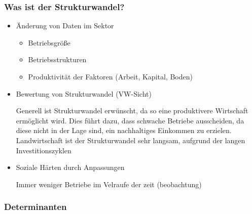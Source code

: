 \documentclass[11pt]{scrartcl}
\begin{document}
\subsubsection{Was ist der Strukturwandel?}
\begin{itemize}
	\item{Änderung von Daten im Sektor}
	\begin{itemize}
		\item Betriebsgröße
		
		\item Betriebsstrukturen

		\item Produktivität der Faktoren (Arbeit, Kapital, Boden)
	\end{itemize}
	\item{Bewertung von Strukturwandel (\ac{VW}-Sicht)}

		Generell ist Strukturwandel erwünscht, da so eine produktivere Wirtschaft ermöglicht wird. Dies führt dazu, dass \glqq schwache\grqq{}  Betriebe ausscheiden, da diese nicht in der Lage sind, ein nachhaltiges Einkommen zu erzielen.
Landwirtschaft ist der Strukturwandel sehr langsam, aufgrund der langen Investitionszyklen
	\item{Soziale Härten durch Anpassungen}

Immer weniger Betriebe im Velraufe der zeit (beobachtung)

\end{itemize}


\subsubsection{Determinanten}
\end{document}
